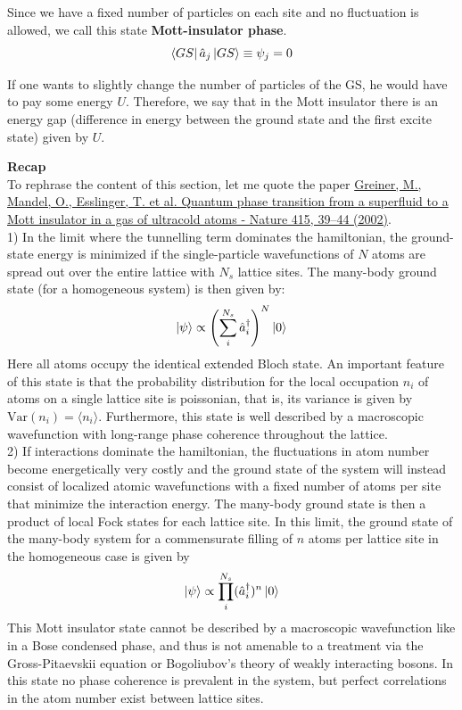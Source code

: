 \begin{itemize}
    Since we have a fixed number of particles on each site and no fluctuation is allowed, we call this state \textbf{Mott-insulator phase}.
    $$\bra{GS}\hat{a}_j\ket{GS} \equiv \psi_j = 0$$

    If one wants to slightly change the number of particles of the GS, he would have to pay some energy $U$. Therefore, we say that in the Mott insulator there is an energy gap (difference in energy between the ground state and the first excite state) given by $U$.
    
\end{itemize}


\begin{tcolorbox}
\textbf{Recap}\\

    To rephrase the content of this section, let me quote the paper \href{https://www.nature.com/articles/415039aa}{Greiner, M., Mandel, O., Esslinger, T. et al. Quantum phase transition from a superfluid to a Mott insulator in a gas of ultracold atoms - Nature 415, 39–44 (2002)}.\\
    
    1) In the limit where the tunnelling term dominates the hamiltonian, the ground-state energy is minimized if the single-particle wavefunctions of $N$ atoms are spread out over the entire lattice with $N_s$ lattice sites. The many-body ground state (for a homogeneous system) is then given by:
    \[
    \ket{\psi}\propto \left(\sum_i^{N_s}\hat{a}_i^\dag\right)^N \ket{0}
    \]
    Here all atoms occupy the identical extended Bloch state. An important feature of this state is that the probability distribution for the local occupation $n_i$ of atoms on a single lattice site is poissonian, that is, its variance is given by $\text{Var}(n_i) =\langle n_i\rangle$. Furthermore, this state is well described by a macroscopic wavefunction with long-range phase coherence throughout the lattice.\\

    2) If interactions dominate the hamiltonian, the fluctuations in atom number become energetically very costly and the ground state of the system will instead consist of localized atomic wavefunctions with a fixed number of atoms per site that minimize the interaction energy. The many-body ground state is then a product of local Fock states for each lattice site. In this limit, the ground state of the many-body system for a commensurate filling of $n$ atoms per lattice site in the homogeneous case is given by
    \[
    \ket{\psi}\propto \prod_i^{N_s}(\hat{a}_i^\dag)^n\ket{0} 
    \]
    This Mott insulator state cannot be described by a macroscopic wavefunction like in a Bose condensed phase, and thus is not amenable to a treatment via the Gross-Pitaevskii equation or Bogoliubov's theory of weakly interacting bosons. In this state no phase coherence is prevalent in the system, but perfect correlations in the atom number exist between lattice sites.
\end{tcolorbox}




